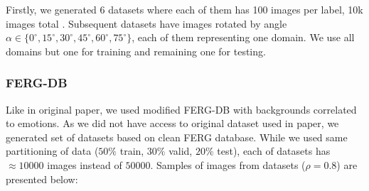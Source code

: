 \documentclass{article} %
\begin{document}
Firstly, we generated 6 datasets where each of them has 100 images per label, 10k images total . Subsequent datasets have images rotated by angle
$\alpha \in \{0^{\circ}, 15^{\circ}, 30^{\circ}, 45^{\circ}, 60^{\circ}, 75^{\circ}\}$, each of them representing one domain.    
We use all domains but one for training and remaining one for testing.

\subsubsection{FERG-DB}

Like in original paper, we used modified FERG-DB with backgrounds correlated to emotions. As we did not have access to original dataset
used in paper, we generated set of datasets based on clean FERG database. While we used same partitioning of data ($50\%$ train, $30\%$ valid, $20\%$ test),
each of datasets has $\approx 10 000$ images instead of $50 000$. Samples of images from datasets ($\rho=0.8$) are presented below:
\end{document}
